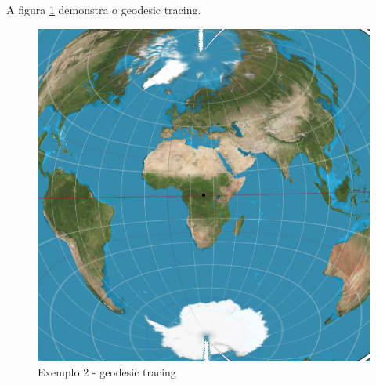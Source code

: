 A figura \ref{img:ex2gt} demonstra o geodesic tracing.
\begin{figure}[h!]
    \includegraphics[width=\linewidth]{ex2gt.png}
    \caption{Exemplo 2 - geodesic tracing}
    \label{img:ex2gt}
\end{figure}